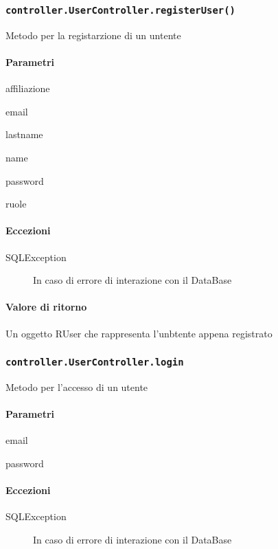 \subsubsection{\texttt{controller.UserController.registerUser()}}
Metodo per la registarzione di un untente
\paragraph{Parametri}
\begin{description}
\item affiliazione
\item email
\item lastname
\item name
\item password
\item ruole
\end{description}
\paragraph{Eccezioni}
\begin{description}
\item[SQLException] In caso di errore di interazione con il DataBase
\end{description}
\paragraph{Valore di ritorno}
Un oggetto RUser che rappresenta l'unbtente appena registrato

\subsubsection{\texttt{controller.UserController.login}}
Metodo per l'accesso di un utente
\paragraph{Parametri}
\begin{description}
\item email
\item password
\end{description}
\paragraph{Eccezioni}
\begin{description}
\item[SQLException] In caso di errore di interazione con il DataBase
\end{description}
